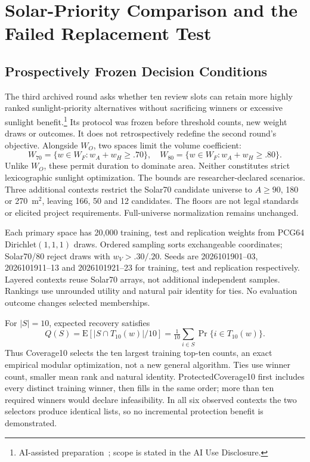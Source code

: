 \documentclass{llncs}
\newcommand{\aidraft}{\footnote{AI-assisted preparation~\cite{openai2026}; scope is stated in the AI Use Disclosure.}}
\begin{document}
\section{Solar-Priority Comparison and the Failed Replacement Test}
\subsection{Prospectively Frozen Decision Conditions}
The third archived round asks whether ten review slots can retain more highly ranked sunlight-priority alternatives without sacrificing winners or excessive sunlight benefit.\aidraft{} Its protocol was frozen before threshold counts, new weight draws or outcomes. It does not retrospectively redefine the second round's objective. Alongside $W_O$, two spaces limit the volume coefficient:
\begin{equation}
 W_{70}=\{w\in W_F:w_A+w_H\geq.70\},\quad
 W_{80}=\{w\in W_F:w_A+w_H\geq.80\}.
\end{equation}
Unlike $W_O$, these permit duration to dominate area. Neither constitutes strict lexicographic sunlight optimization. The bounds are researcher-declared scenarios. Three additional contexts restrict the Solar70 candidate universe to $A\geq90$, 180 or 270~m$^2$, leaving 166, 50 and 12 candidates. The floors are not legal standards or elicited project requirements. Full-universe normalization remains unchanged.

Each primary space has 20,000 training, test and replication weights from PCG64 Dirichlet$(1,1,1)$ draws. Ordered sampling sorts exchangeable coordinates; Solar70/80 reject draws with $w_V>.30/.20$. Seeds are 2026101901--03, 2026101911--13 and 2026101921--23 for training, test and replication respectively. Layered contexts reuse Solar70 arrays, not additional independent samples. Rankings use unrounded utility and natural pair identity for ties. No evaluation outcome changes selected memberships.

For $|S|=10$, expected recovery satisfies
\begin{equation}
 Q(S)=\mathrm E\left[|S\cap T_{10}(w)|/10\right]
 =\tfrac1{10}\sum_{i\in S}\Pr\{i\in T_{10}(w)\}.
\end{equation}
Thus Coverage10 selects the ten largest training top-ten counts, an exact empirical modular optimization, not a new general algorithm. Ties use winner count, smaller mean rank and natural identity. ProtectedCoverage10 first includes every distinct training winner, then fills in the same order; more than ten required winners would declare infeasibility. In all six observed contexts the two selectors produce identical lists, so no incremental protection benefit is demonstrated.
\end{document}
